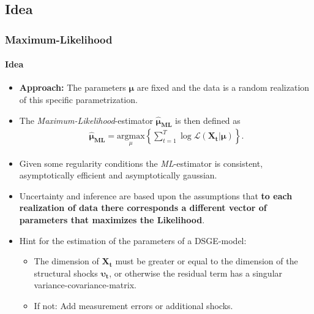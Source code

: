 \documentclass{beamer} %
\begin{document}
\subsection{Idea}
\begin{frame}\frametitle{Maximum-Likelihood}\framesubtitle{Idea}
  \begin{itemize}
    \item \textbf{Approach:} The parameters $\boldsymbol{\mu}$ are fixed and the data is a random realization of this specific parametrization.
    \item  The \emph{Maximum-Likelihood}-estimator $\boldsymbol{\widehat{\mu}_{ML}}$ is then defined as
    \begin{align*}
    \boldsymbol{\widehat{\mu}_{ML}} = \underset{\mu}{\text{argmax}}\left\{ \sum_{t=1}^T \log{\mathcal{L}(\mathbf{X_t}|\boldsymbol{\mu})} \right\}.
    \end{align*}
    \item Given some regularity conditions the \emph{ML}-estimator is consistent, asymptotically efficient and asymptotically gaussian.
    \item Uncertainty and inference are based upon the assumptions that \textbf{to each realization of data there corresponds a different vector of parameters that maximizes the Likelihood}.
    \item Hint for the estimation of the parameters of a DSGE-model:
    \begin{itemize} \item The dimension of $\mathbf{X_t}$ must be greater or equal to the dimension of the structural shocks $\boldsymbol{\upsilon_t}$, or otherwise the residual term has a singular variance-covariance-matrix.
    \item If not: Add measurement errors or additional shocks.
  \end{itemize}
  \end{itemize}
\end{frame}
\end{document}
